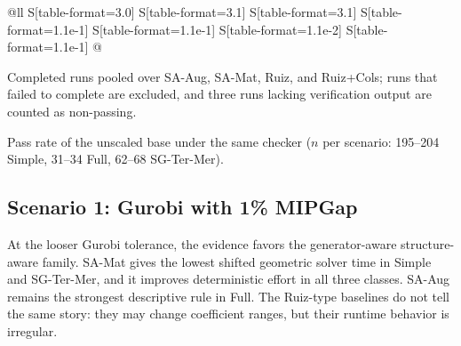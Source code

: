 \documentclass[AMA,Times1COL]{WileyNJDv5} %
\newcommand{\methodAug}{SA-Aug}
\newcommand{\methodMat}{SA-Mat}
\newcommand{\methodRuiz}{Ruiz}
\newcommand{\methodRuizCols}{Ruiz+Cols}
\providecommand{\DIFadd}[1]{{\protect\color{blue} \sf #1}} %
\providecommand{\DIFdel}[1]{{\protect\color{red} \scriptsize #1}} %
\providecommand{\DIFaddbegin}{} %
\providecommand{\DIFaddend}{} %
\providecommand{\DIFdelbegin}{} %
\providecommand{\DIFdelend}{} %
\providecommand{\DIFaddFL}[1]{\DIFadd{#1}} %
\begin{document}
\begin{table}[t]
\begin{threeparttable}
\begin{tabular}{@{}ll S[table-format=3.0] S[table-format=3.1] S[table-format=3.1] S[table-format=1.1e-1] S[table-format=1.1e-1] S[table-format=1.1e-2] S[table-format=1.1e-1] @{}}
\bottomrule
\end{tabular}
\begin{tablenotes}[flushleft]\footnotesize
\item[\DIFaddFL{a}] Completed runs pooled over \methodAug{}, \methodMat{}, \methodRuiz{}, and
\methodRuizCols{}; runs that failed to complete are excluded, and three runs lacking
verification output are counted as non-passing.
\item[\DIFaddFL{b}] Pass rate of the unscaled base under the same checker
($n$ per scenario: 195--204 Simple, 31--34 Full, 62--68 SG-Ter-Mer).
\end{tablenotes}
\end{threeparttable}
\end{table}

\DIFaddend \subsection{Scenario 1: Gurobi with 1\% MIPGap}

At the looser Gurobi tolerance, the evidence favors the \DIFdelbegin \DIFdel{generator-aware }\DIFdelend \DIFaddbegin \DIFadd{structure-aware }\DIFaddend family.
\methodMat{} gives the lowest shifted geometric solver time in Simple and SG-Ter-Mer,
and it improves deterministic effort in all three classes. \methodAug{} remains the
strongest descriptive rule in Full. The Ruiz-type baselines do not tell the same story:
they may change coefficient ranges, but their runtime behavior is irregular.
\end{document}
